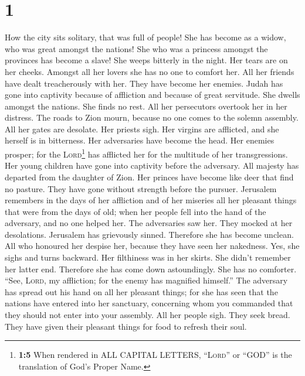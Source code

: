 \hypertarget{section}{%
\section{1}\label{section}}

 How the city sits solitary, that was full of people! She
has become as a widow, who was great amongst the nations! She who was a
princess amongst the provinces has become a slave!  She
weeps bitterly in the night. Her tears are on her cheeks. Amongst all
her lovers she has no one to comfort her. All her friends have dealt
treacherously with her. They have become her enemies. 
Judah has gone into captivity because of affliction and because of great
servitude. She dwells amongst the nations. She finds no rest. All her
persecutors overtook her in her distress.  The roads to
Zion mourn, because no one comes to the solemn assembly. All her gates
are desolate. Her priests sigh. Her virgins are afflicted, and she
herself is in bitterness.  Her adversaries have become the
head. Her enemies prosper; for the \textsc{Lord}\footnote{\textbf{1:5}
  When rendered in ALL CAPITAL LETTERS, ``\textsc{Lord}'' or ``GOD'' is
  the translation of God's Proper Name.} has afflicted her for the
multitude of her transgressions. Her young children have gone into
captivity before the adversary.  All majesty has departed
from the daughter of Zion. Her princes have become like deer that find
no pasture. They have gone without strength before the pursuer.
 Jerusalem remembers in the days of her affliction and of
her miseries all her pleasant things that were from the days of old;
when her people fell into the hand of the adversary, and no one helped
her. The adversaries saw her. They mocked at her desolations.
 Jerusalem has grievously sinned. Therefore she has become
unclean. All who honoured her despise her, because they have seen her
nakedness. Yes, she sighs and turns backward.  Her
filthiness was in her skirts. She didn't remember her latter end.
Therefore she has come down astoundingly. She has no comforter. ``See,
\textsc{Lord}, my affliction; for the enemy has magnified himself.''
 The adversary has spread out his hand on all her
pleasant things; for she has seen that the nations have entered into her
sanctuary, concerning whom you commanded that they should not enter into
your assembly.  All her people sigh. They seek bread.
They have given their pleasant things for food to refresh their soul.
